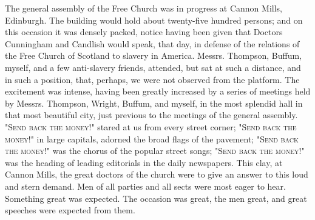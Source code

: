 The general assembly of the Free Church was in progress at Cannon Mills,
Edinburgh. The building would hold about twenty-five hundred persons;
and on this occasion it was densely packed, notice having been given
that Doctors Cunningham and Candlish would speak, that day, in defense
of the relations of the Free Church of Scotland to slavery in America.
Messrs. Thompson, Buffum, myself, and a few anti-slavery friends,
attended, but sat at such a distance, and in such a position, that,
perhaps, we were not observed from the platform. The excitement was
intense, having been greatly increased by a series of meetings held by
Messrs. Thompson, Wright, Buffum, and myself, in the most splendid hall
in that most beautiful city, just previous to the meetings of the
general assembly. "\textsc{Send back the money}!" stared at us from
every street corner; "\textsc{Send back the money}!" in large capitals,
adorned the broad flags of the pavement; "\textsc{Send back the money}!"
was the chorus of the popular street songs; "\textsc{Send back the
money}!" was the heading of leading editorials in the {}daily
newspapers. This clay, at Cannon Mills, the great doctors of the church
were to give an answer to this loud and stern demand. Men of all parties
and all sects were most eager to hear. Something great was expected. The
occasion was great, the men great, and great speeches were expected from
them.

